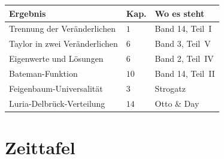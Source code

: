 \begin{merksatz}
\begin{center}
{\small
\renewcommand{\arraystretch}{1.5}
\begin{tabular}{@{}P{3.4cm}P{1.4cm}P{3.4cm}@{}}
\toprule
\textbf{Ergebnis} & \textbf{Kap.} & \textbf{Wo es steht}\\
\midrule
Trennung der Veränderlichen & $1$ & Band 14, Teil~I\\
Taylor in zwei Veränderlichen & $6$ & Band 3, Teil~V\\
Eigenwerte und Lösungen & $6$ & Band 2, Teil~IV\\
Bateman-Funktion & $10$ & Band 14, Teil~II\\
Feigenbaum-Universalität & $3$ & Strogatz\\
Luria-Delbrück-Verteilung & $14$ & Otto \& Day\\
\bottomrule
\end{tabular}}
\end{center}

\begin{center}
\begin{minipage}{0.88\textwidth}
\end{minipage}
\end{center}
\end{merksatz}

\section{Zeittafel}


